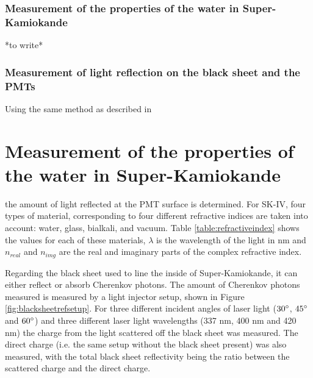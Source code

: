 
\subsubsection{Measurement of the properties of the water in Super-Kamiokande}
*to write*

\subsubsection{Measurement of light reflection on the black sheet and the PMTs} 

Using the same method as described in \section{Measurement of the properties of the water in Super-Kamiokande} the amount of light reflected at the PMT surface is determined. For SK-IV, four types of material, corresponding to four different refractive indices are taken into account: water, glass, bialkali, and vacuum. Table \ref{table:refractiveindex} shows the values for each of these materials, $\lambda$ is the wavelength of the light in nm and $n_{real}$ and $n_{img}$ are the real and imaginary parts of the complex refractive index.

Regarding the black sheet used to line the inside of Super-Kamiokande, it can either reflect or absorb Cherenkov photons. The amount of Cherenkov photons measured is measured by a light injector setup, shown in Figure \ref{fig:blacksheetrefsetup}. For three different incident angles of laser light ($30 \degree$, $45 \degree$ and $60 \degree$) and three different laser light wavelengths (337 nm, 400 nm and 420 nm) the charge from the light scattered off the black sheet was measured. The direct charge (i.e. the same setup without the black sheet present) was also measured, with the total black sheet reflectivity being the ratio between the scattered charge and the direct charge.

